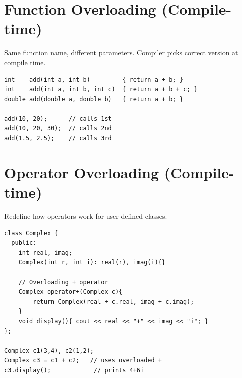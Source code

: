 \documentclass[12pt,a4paper]{report}
\begin{document}
\begin{center}
\end{center}

\section{Function Overloading (Compile-time)}
Same function name, different parameters. Compiler picks correct version at compile time.

\begin{lstlisting}[caption={Function Overloading}]
int    add(int a, int b)         { return a + b; }
int    add(int a, int b, int c)  { return a + b + c; }
double add(double a, double b)   { return a + b; }

add(10, 20);      // calls 1st
add(10, 20, 30);  // calls 2nd
add(1.5, 2.5);    // calls 3rd
\end{lstlisting}

\section{Operator Overloading (Compile-time)}
Redefine how operators work for user-defined classes.

\begin{lstlisting}[caption={Operator Overloading -- Complex numbers}]
class Complex {
  public:
    int real, imag;
    Complex(int r, int i): real(r), imag(i){}

    // Overloading + operator
    Complex operator+(Complex c){
        return Complex(real + c.real, imag + c.imag);
    }
    void display(){ cout << real << "+" << imag << "i"; }
};

Complex c1(3,4), c2(1,2);
Complex c3 = c1 + c2;   // uses overloaded +
c3.display();            // prints 4+6i
\end{lstlisting}
\end{document}

